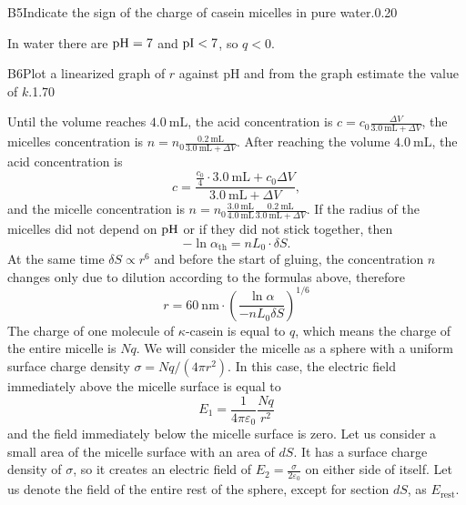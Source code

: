 \documentclass[11pt,a4paper]{article}
\begin{document}
\begin{solcard}{B5}{Indicate the sign of the charge of casein micelles in pure water.}{0.20}

In water there are $\rm pH=7$ and $\rm pI < 7$, so $q < 0$.

\end{solcard}

\begin{solcard}{B6}{Plot a linearized graph of $r$ against $\mathrm{pH}$ and from the graph estimate the value of $k$.}{1.70}

Until the volume reaches $4.0~\mathrm{mL}$, the acid concentration is $c=c_0\frac{\Delta V}{3.0~\mathrm{mL} + \Delta V}$, the micelles concentration is $n=n_0 \frac{0.2~\mathrm{mL}}{3.0~\mathrm{mL} + \Delta V}$. After reaching the volume $4.0~\mathrm{mL}$, the acid concentration is \[c = \frac{\frac{c_0}{4} \cdot 3.0~\mathrm{mL} + c_0 \Delta V}{3.0~\mathrm{mL} + \Delta V},\] and the micelle concentration is $n = n_0 \frac{3.0~\mathrm{mL}}{4.0~\mathrm{mL}} \frac{0.2~\mathrm{mL}}{3.0~\mathrm{mL} + \Delta V} $. If the radius of the micelles did not depend on $\rm pH$ or if they did not stick together, then \[-\ln \alpha_\text{th} = nL_0 \cdot \delta S.\]At the same time $\delta S \propto r^6$ and before the start of gluing, the concentration $n$ changes only due to dilution according to the formulas above, therefore \[r = 60~\mathrm{nm} \cdot \left( \frac{\ln \alpha}{-nL_0 \delta S} \right)^{1/6}\]The charge of one molecule of $\kappa$-casein is equal to $q$, which means the charge of the entire micelle is $Nq$. We will consider the micelle as a sphere with a uniform surface charge density $\sigma = Nq/(4\pi r^2)$. In this case, the electric field immediately above the micelle surface is equal to \[E_1 = \frac{1}{4 \pi \varepsilon_0} \frac{Nq}{r^2}\] and the field immediately below the micelle surface is zero. Let us consider a small area of the micelle surface with an area of $dS$. It has a surface charge density of $\sigma$, so it creates an electric field of $E_2=\frac{\sigma}{2 \varepsilon_0}$ on either side of itself. Let us denote the field of the entire rest of the sphere, except for section $dS$, as $E_\text{rest}$.



\end{solcard}
\end{document}

